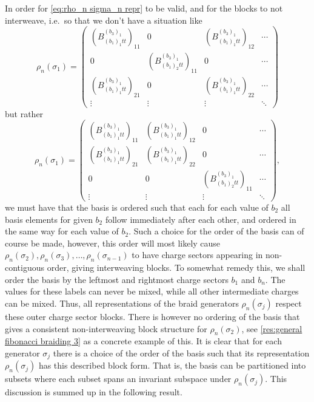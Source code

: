 \documentclass[a4paper,10pt,oneside]{book}
\theoremstyle{plain}
\theoremstyle{definition}
\theoremstyle{remark}
\begin{document}
In order for \cref{eq:rho_n sigma_n repr} to be valid, and for the blocks to not interweave, i.e.\ so that we don't have a situation like
\begin{equation}
  ρ_n(σ_1) =
  \begin{pmatrix}
    \left(B_{(b_1)_1 t t}^{(b_3)_1}\right)_{11} & 0 & \left(B_{(b_1)_1 t t}^{(b_3)_1}\right)_{12} & \cdots \\
    0 & \left(B_{(b_1)_2 t t}^{(b_3)_1}\right)_{11} & 0 & \cdots \\
    \left(B_{(b_1)_1 t t}^{(b_3)_1}\right)_{21} & 0 & \left(B_{(b_1)_1 t t}^{(b_3)_1}\right)_{22} & \cdots \\
    \vdots & \vdots & \vdots & \ddots
  \end{pmatrix}
\end{equation}
but rather
\begin{equation}
  ρ_n(σ_1) =
  \begin{pmatrix}
    \left(B_{(b_1)_1 t t}^{(b_3)_1}\right)_{11} & \left(B_{(b_1)_1 t t}^{(b_3)_1}\right)_{12} & 0 & \cdots \\
    \left(B_{(b_1)_1 t t}^{(b_3)_1}\right)_{21} & \left(B_{(b_1)_1 t t}^{(b_3)_1}\right)_{22} & 0 & \cdots \\
    0 & 0 & \left(B_{(b_1)_2 t t}^{(b_3)_1}\right)_{11} & \cdots \\
    \vdots & \vdots & \vdots & \ddots
  \end{pmatrix},
\end{equation}
we must have that the basis is ordered such that each for each value of $b_2$ all basis elements for given $b_2$ follow immediately after each other, and ordered in the same way for each value of $b_2$. Such a choice for the order of the basis can of course be made, however, this order will most likely cause $ρ_n(σ_2), ρ_n(σ_3), \dots, ρ_n(σ_{n-1})$ to have charge sectors appearing in non-contiguous order, giving interweaving blocks. To somewhat remedy this, we shall order the basis by the leftmost and rightmost charge sectors $b_1$ and $b_n$. The values for these labels can never be mixed, while all other intermediate charges can be mixed. Thus, all representations of the braid generators $ρ_n(σ_j)$ respect these outer charge sector blocks. There is however no ordering of the basis that gives a consistent non-interweaving block structure for $ρ_n(σ_2)$, see \cref{res:general fibonacci braiding 3} as a concrete example of this. It is clear that for each generator $σ_j$ there is a choice of the order of the basis such that its representation $ρ_n(σ_j)$ has this described block form. That is, the basis can be partitioned into subsets where each subset spans an invariant subspace under $ρ_n(σ_j)$. This discussion is summed up in the following result.
\end{document}
